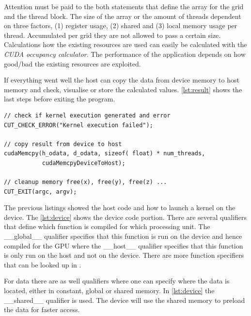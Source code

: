Attention must be paid to the both statements that define the array for the grid
and the thread block. The size of the array or the amount of threads dependent
on three factors, (1) register usage, (2) shared and (3) local memory usage per
thread. Accumulated per grid they are not allowed to pass a certain size.
Calculations how the existing resources are used can easily be calculated with
the \emph{CUDA occupancy calculator}. The performance of the application depends
on how good/bad the existing resources are exploited.

If everything went well the host can copy the data from device memory
to host memory and check, visualise or store the calculated values.
\autoref{lst:result} shows the last steps before exiting the program.

\begin{lstlisting}[caption=Retrieving of the Results, label=lst:result]
// check if kernel execution generated and error
CUT_CHECK_ERROR("Kernel execution failed");
 
// copy result from device to host
cudaMemcpy(h_odata, d_odata, sizeof( float) * num_threads, 
           cudaMemcpyDeviceToHost);

// cleanup memory free(x), free(y), free(z) ...
CUT_EXIT(argc, argv);
\end{lstlisting} 

The previous listings showed the host code and how to launch a kernel on the
device. The \autoref{lst:device} shows the device code portion. There are
several qualifiers that define which function is compiled for which processing
unit. The \textsf{\_\_global\_\_} qualifier specifies that this function is run
on the device and hence compiled for the \gls{GPU} where the
\textsf{\_\_host\_\_} qualifier specifies that this function is only run on the
host and not on the device. There are more function specifiers that can be
looked up in \citep{citeulike:3325943}.

For data there are as well qualifiers where one can specify where the data is
located, either in constant, global or shared memory. In \autoref{lst:device}
the \textsf{\_\_shared\_\_} qualifier is used. The device will use the shared
memory to preload the data for faster access.

